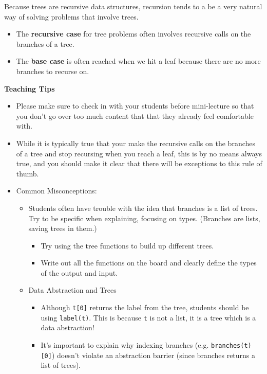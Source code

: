 Because trees are recursive data structures, recursion tends to a be a very natural way of solving problems that involve trees. 
\begin{itemize}
	\item The \textbf{recursive case} for tree problems often involves recursive calls on the branches of a tree. 
	\item The \textbf{base case} is often reached when we hit a leaf because there are no more branches to recurse on. 
\end{itemize}


\begin{guide}
	\textbf{Teaching Tips}
	\begin{itemize}
			\item Please make sure to check in with your students before mini-lecture so that you don't go over too much content that that they already feel comfortable with. 
			\item While it is typically true that your make the recursive calls on the branches of a tree and stop recursing when you reach a leaf, this is by no means always true, and you should make it clear that there will be exceptions to this rule of thumb. 
			\item Common Misconceptions:
			\begin{itemize}
				\item Students often have trouble with the idea that branches is a list of trees. Try to be specific when explaining, focusing on types. (Branches are lists, saving trees in them.)
				\begin{itemize}
					\item Try using the tree functions to build up different trees.
					\item Write out all the functions on the board and clearly define the types of the output and input.
				\end{itemize}
				\item Data Abstraction and Trees
				\begin{itemize}
					\item Although \lstinline{t[0]} returns the label from the tree, students should be using \lstinline{label(t)}. This is because \lstinline{t} is not a list, it is a tree which is a data abstraction!
					\item It’s important to explain why indexing branches (e.g. \lstinline{branches(t)[0]}) doesn't violate an abstraction barrier (since branches returns a list of trees).
				\end{itemize}

\end{itemize}
\end{itemize}
\end{guide}
